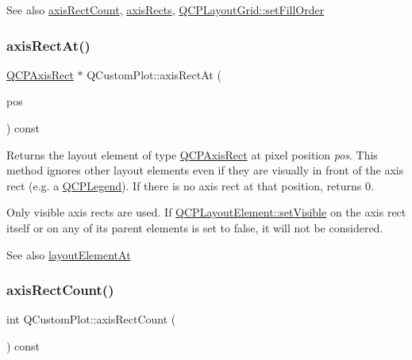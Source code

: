 \begin{DoxySeeAlso}{See also}
\hyperlink{classQCustomPlot_a8f85940aaac50efb466287d9d2d04ec6}{axis\+Rect\+Count}, \hyperlink{classQCustomPlot_a12af771429e2d7e313c8c5d5fca068fe}{axis\+Rects}, \hyperlink{classQCPLayoutGrid_affc2f3cfd22f28698c5b29b960d2a391}{Q\+C\+P\+Layout\+Grid\+::set\+Fill\+Order} 
\end{DoxySeeAlso}
\mbox{\label{classQCustomPlot_a4a08842fc3e9ba6bed83aa410c5c5ba5}} 
\subsubsection{\texorpdfstring{axis\+Rect\+At()}{axisRectAt()}}
{\footnotesize\ttfamily \hyperlink{classQCPAxisRect}{Q\+C\+P\+Axis\+Rect} $\ast$ Q\+Custom\+Plot\+::axis\+Rect\+At (\begin{DoxyParamCaption}\item[{const Q\+PointF \&}]{pos }\end{DoxyParamCaption}) const}

Returns the layout element of type \hyperlink{classQCPAxisRect}{Q\+C\+P\+Axis\+Rect} at pixel position {\itshape pos}. This method ignores other layout elements even if they are visually in front of the axis rect (e.\+g. a \hyperlink{classQCPLegend}{Q\+C\+P\+Legend}). If there is no axis rect at that position, returns 0.

Only visible axis rects are used. If \hyperlink{classQCPLayerable_a3bed99ddc396b48ce3ebfdc0418744f8}{Q\+C\+P\+Layout\+Element\+::set\+Visible} on the axis rect itself or on any of its parent elements is set to false, it will not be considered.

\begin{DoxySeeAlso}{See also}
\hyperlink{classQCustomPlot_afaa1d304e0287d140fd238e90889ef3c}{layout\+Element\+At} 
\end{DoxySeeAlso}
\mbox{\label{classQCustomPlot_a8f85940aaac50efb466287d9d2d04ec6}} 
\subsubsection{\texorpdfstring{axis\+Rect\+Count()}{axisRectCount()}}
{\footnotesize\ttfamily int Q\+Custom\+Plot\+::axis\+Rect\+Count (\begin{DoxyParamCaption}{ }\end{DoxyParamCaption}) const}

